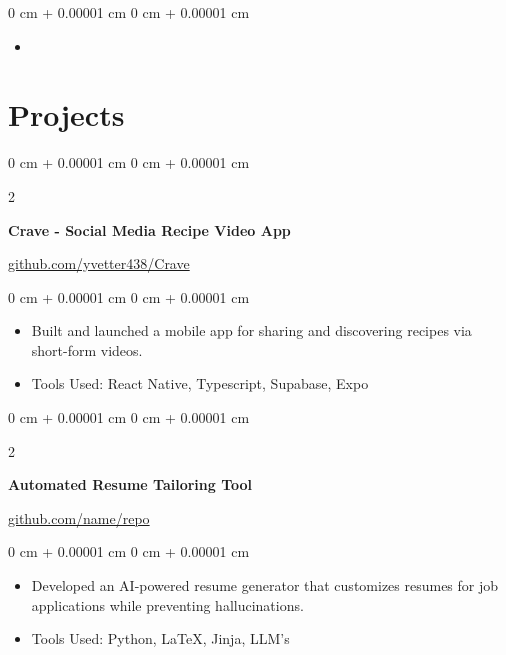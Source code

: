 \documentclass[10pt, letterpaper]{article}
\newenvironment{highlights}{
    \begin{itemize}[
        topsep=0.10 cm,
        parsep=0.10 cm,
        partopsep=0pt,
        itemsep=0pt,
        leftmargin=0 cm + 20pt
    ]
}{
    \end{itemize}
} %
\newenvironment{onecolentry}{
    \begin{adjustwidth}{
        0 cm + 0.00001 cm
    }{
        0 cm + 0.00001 cm
    }
}{
    \end{adjustwidth}
} %
\newenvironment{twocolentry}[2][]{
    \onecolentry
    \def\secondColumn{#2}
    \setcolumnwidth{\fill, 4.5 cm}
    \begin{paracol}{2}
}{
    \switchcolumn \raggedleft \secondColumn
    \end{paracol}
    \endonecolentry
} %
\begin{document}
    \vspace{0.10 cm}
    \begin{onecolentry}
        \begin{highlights}
            \item {}
        \end{highlights}
    \end{onecolentry}

    \section{Projects}

    \begin{twocolentry}{
        \href{https://github.com/sinaatalay/rendercv}{github.com/yvetter438/Crave}
    }
        \textbf{Crave - Social Media Recipe Video App}
    \end{twocolentry}

    \vspace{0.10 cm}
    \begin{onecolentry}
        \begin{highlights}
            \item Built and launched a mobile app for sharing and discovering recipes via short-form videos.
            \item Tools Used: React Native, Typescript, Supabase, Expo
        \end{highlights}
    \end{onecolentry}

    \vspace{0.2 cm}

    \begin{twocolentry}{
        \href{https://github.com/sinaatalay/rendercv}{github.com/name/repo}
    }
        \textbf{Automated Resume Tailoring Tool}
    \end{twocolentry}

    \vspace{0.10 cm}
    \begin{onecolentry}
        \begin{highlights}
            \item Developed an AI-powered resume generator that customizes resumes for job applications while preventing hallucinations.
            \item Tools Used: Python, LaTeX, Jinja, LLM's
        \end{highlights}
    \end{onecolentry}
\end{document}
